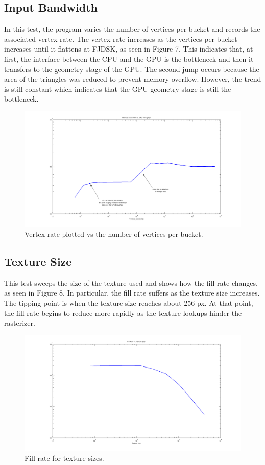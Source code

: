 \documentclass[12pt] {article}
\begin{document}
\subsection{Input Bandwidth}
In this test, the program varies the number of vertices per bucket and records the associated vertex rate. The vertex rate increases as the vertices per bucket increases until it flattens at FJDSK, as seen in Figure 7. This indicates that, at first, the interface between the CPU and the GPU is the bottleneck and then it transfers to the geometry stage of the GPU. The second jump occurs because the area of the triangles was reduced to prevent memory overflow. However, the trend is still constant which indicates that the GPU geometry stage is still the bottleneck.
\begin{figure}[ht!]
	\centering
	\includegraphics[width=5in]{figures/results3-interface-vs-GPU.png}
	\caption{Vertex rate plotted vs the number of vertices per bucket.}
\end{figure}
\FloatBarrier

\newpage
\subsection{Texture Size}
This test sweeps the size of the texture used and shows how the fill rate changes, as seen in Figure 8. In particular, the fill rate suffers as the texture size increases. The tipping point is when the texture size reaches about 256 px. At that point, the fill rate begins to reduce more rapidly as the texture lookups hinder the rasterizer.
\begin{figure}[ht!]
	\centering
	\includegraphics[width=5in]{figures/results4-fill-rate-vs-texture.png}
	\caption{Fill rate for texture sizes.}
\end{figure}
\FloatBarrier
\end{document}
